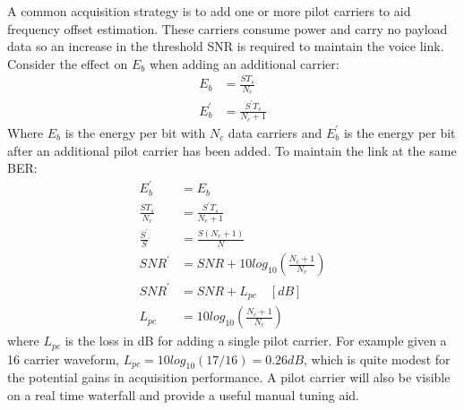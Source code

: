 \documentclass{article}
\begin{document}
A common acquisition strategy is to add one or more pilot carriers to aid frequency offset estimation. These carriers consume power and carry no payload data so an increase in the threshold SNR is required to maintain the voice link. Consider the effect on $E_b$ when adding an additional carrier:
\begin{equation}
\begin{split}
E_b &= \frac{ST_s}{N_c} \\
E^\prime_b &= \frac{S^\prime T_s}{N_c+1}
\end{split}
\end{equation}
Where $E_b$ is the energy per bit with $N_c$ data carriers and $E^\prime_b$ is the energy per bit after an additional pilot carrier has been added.  To maintain the link at the same BER:
\begin{equation}
\begin{split}
E^\prime_b &= E_b \\
\frac{S T_s}{N_c} &= \frac{S^\prime T_s} {N_c+1} \\
\frac{S^\prime}{S} &= \frac{S (N_c+1)}{N} \\
SNR^\prime &= SNR + 10log_{10}\left(\frac{N_c+1}{N_c}\right)  \\
SNR^\prime &= SNR + L_{pc}  \quad [\si{dB}] \\
L_{pc} &= 10log_{10}\left(\frac{N_c+1}{N_c}\right) 
\end{split}
\end{equation}
where $L_{pc}$ is the loss in dB for adding a single pilot carrier.  For example given a 16 carrier waveform, $L_{pc}=10log_{10}(17/16)=0.26 \si{dB}$, which is quite modest for the potential gains in acquisition performance.  A pilot carrier will also be visible on a real time waterfall and provide a useful manual tuning aid.
\end{document}
